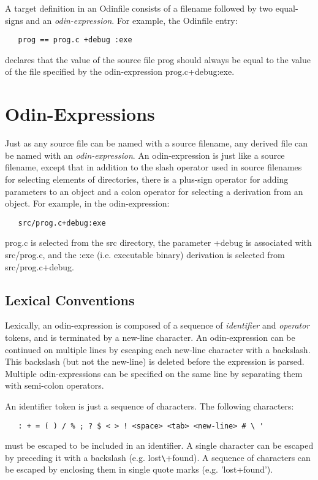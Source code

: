 A target definition in an {\ex Odinfile} consists of a filename
followed by two equal-signs and an {\em odin-expression}.
For example, the {\ex Odinfile} entry:
\begin{verbatim}
   prog == prog.c +debug :exe
\end{verbatim}
declares that the value of the source file {\ex prog}
should always be equal to the value
of the file specified by the odin-expression {\ex prog.c+debug:exe}.

\section{Odin-Expressions}
\label{odinexpr}

Just as any source file can be named with a source filename,
any derived file can be named with an {\em odin-expression}.
An odin-expression is just like a source filename,
except that in addition to the slash operator used in source filenames
for selecting elements of directories,
there is a plus-sign operator for adding parameters to an object
and a colon operator for selecting a derivation from an object.
For example, in the odin-expression:
\begin{verbatim}
   src/prog.c+debug:exe
\end{verbatim}
{\ex prog.c} is selected from the {\ex src} directory,
the parameter {\ex +debug} is associated with {\ex src/prog.c},
and the {\ex :exe} (i.e. executable binary) derivation 
is selected from {\ex src/prog.c+debug}.

\subsection{Lexical Conventions}

Lexically, an odin-expression is composed of a sequence of 
{\em identifier} and {\em operator} tokens,
and is terminated by a new-line character.
An odin-expression can be continued on multiple lines
by escaping each new-line character with a backslash.
This backslash (but not the new-line) is deleted
before the expression is parsed.
Multiple odin-expressions can be specified on the same line
by separating them with semi-colon operators.

An identifier token is just a sequence of characters.
The following characters:
\begin{verbatim}
   : + = ( ) / % ; ? $ < > ! <space> <tab> <new-line> # \ ' 
\end{verbatim}
must be escaped to be included in an identifier.
A single character can be escaped by preceding it with a backslash
(e.g. {\ex lost\verb.\.+found}).
A sequence of characters can be escaped
by enclosing them in single quote marks (e.g. {\ex 'lost+found'}).

